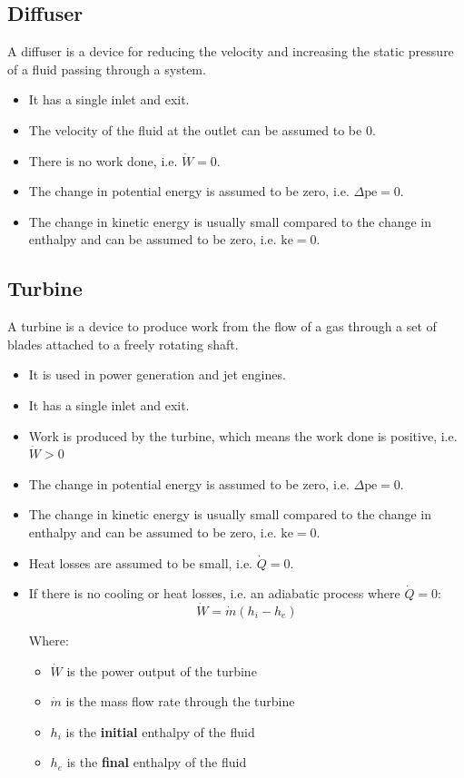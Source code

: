 \documentclass[11pt]{article}
\begin{document}
\subsection{Diffuser}
\label{sec:orgdf4f05f}
A diffuser is a device for reducing the velocity and increasing the static pressure of a fluid passing through a system.
\begin{itemize}
\item It has a single inlet and exit.
\item The velocity of the fluid at the outlet can be assumed to be \(0\).
\item There is no work done, i.e. \(\dot{W} = 0\).
\item The change in potential energy is assumed to be zero, i.e. \(\Delta \text{pe} = 0\).
\item The change in kinetic energy is usually small compared to the change in enthalpy and can be assumed to be zero, i.e. \(\text{ke} = 0\).
\end{itemize}

\subsection{Turbine}
\label{sec:orgf98706b}
A turbine is a device to produce work from the flow of a gas through a set of blades attached to a freely rotating shaft.
\begin{itemize}
\item It is used in power generation and jet engines.
\item It has a single inlet and exit.
\item Work is produced by the turbine, which means the work done is positive, i.e. \(\dot{W} > 0\)
\item The change in potential energy is assumed to be zero, i.e. \(\Delta \text{pe} = 0\).
\item The change in kinetic energy is usually small compared to the change in enthalpy and can be assumed to be zero, i.e. \(\text{ke} = 0\).
\item Heat losses are assumed to be small, i.e. \(\dot{Q} = 0\).
\item If there is no cooling or heat losses, i.e. an adiabatic process where \(\dot{Q} = 0\):
\[\dot{W} = \dot{m} \left(h_i - h_e \right)\]

Where:
\begin{itemize}
\item \(\dot{W}\) is the power output of the turbine
\item \(\dot{m}\) is the mass flow rate through the turbine
\item \(h_i\) is the \textbf{initial} enthalpy of the fluid
\item \(h_e\) is the \textbf{final} enthalpy of the fluid
\end{itemize}
\end{itemize}
\end{document}

